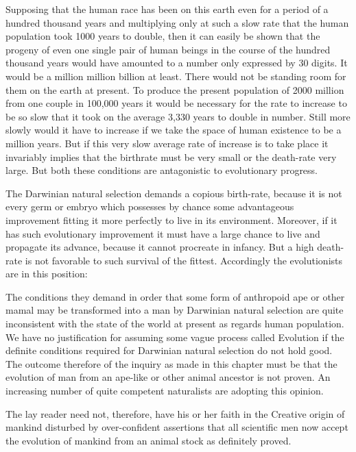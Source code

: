 Supposing that the human race has been on this earth even for a period of a hundred thousand
years and multiplying only at such a slow rate that the human population took 1000 years to
double, then it can easily be shown that the progeny of even one single pair of human beings
in the course of the hundred thousand years would have amounted to a number only
expressed by 30 digits. It would be a million million billion at least. There would not be
standing room for them on the earth at present. To produce the present population of 2000
million from one couple in 100,000 years it would be necessary for the rate to increase to be
so slow that it took on the average 3,330 years to double in number. Still more slowly would
it have to increase if we take the space of human existence to be a million years. But if this
very slow average rate of increase is to take place it invariably implies that the birthrate must
be very small or the death-rate very large. But both these conditions are antagonistic to
evolutionary progress.

The Darwinian natural selection demands a copious birth-rate, because it is not every germ or
embryo which possesses by chance some advantageous improvement fitting it more perfectly
to live in its environment. Moreover, if it has such evolutionary improvement it must have a
large chance to live and propagate its advance, because it cannot procreate in infancy. But a
high death-rate is not favorable to such survival of the fittest. Accordingly the evolutionists
are in this position:

The conditions they demand in order that some form of anthropoid ape or other mamal may
be transformed into a man by Darwinian natural selection are quite inconsistent with the state
of the world at present as regards human population. We have no justification for assuming
some vague process called Evolution if the definite conditions required for Darwinian natural
selection do not hold good. The outcome therefore of the inquiry as made in this chapter
must be that the evolution of man from an ape-like or other animal ancestor is not proven. An
increasing number of quite competent naturalists are adopting this opinion.

The lay reader need not, therefore, have his or her faith in the Creative origin of mankind
disturbed by over-confident assertions that all scientific men now accept the evolution of
mankind from an animal stock as definitely proved.

